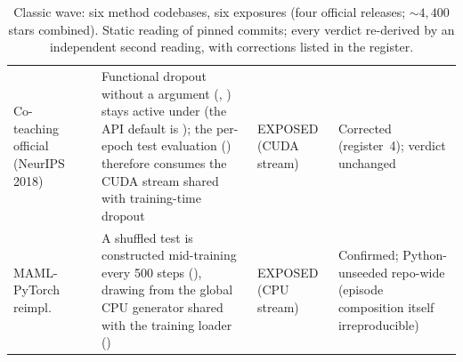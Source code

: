 \begin{table}[tbp]
\begin{tabular}{@{}L{2.0cm}L{1.1cm}L{5.7cm}L{1.6cm}L{3.3cm}@{}}
\addlinespace
Co-teaching official (NeurIPS 2018) &  &
Functional dropout without a  argument (,
) stays active under  (the API default is
); the per-epoch test evaluation ()
therefore consumes the CUDA stream shared with training-time dropout &
EXPOSED (CUDA stream) &
Corrected (register~4); verdict unchanged \\
\addlinespace
MAML-PyTorch reimpl. &  &
A shuffled test  is constructed mid-training every 500
steps (), drawing  from
the global CPU generator shared with the training loader () &
EXPOSED (CPU stream) &
Confirmed; Python- unseeded repo-wide (episode composition
itself irreproducible) \\
\bottomrule
\end{tabular}
\caption{Classic wave: six method codebases, six exposures (four official
releases; ${\sim}4{,}400$ stars combined). Static reading of pinned
commits; every verdict re-derived by an independent second reading, with
corrections listed in the register.}
\label{tab:classic}
\end{table}

